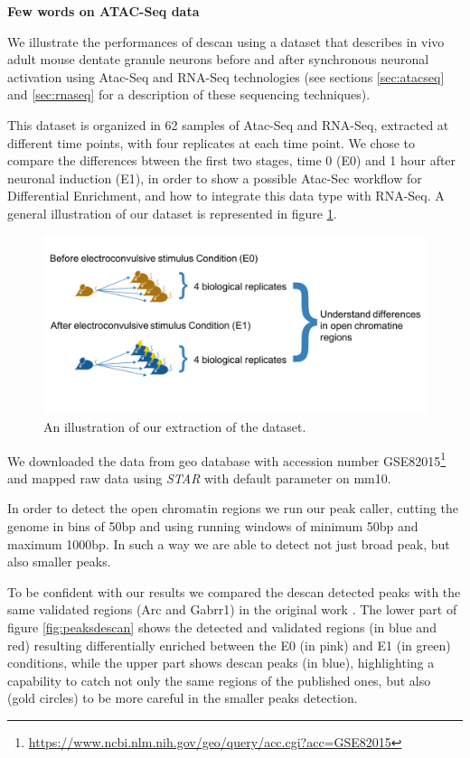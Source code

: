 \textbf{Few words on ATAC-Seq data}

We illustrate the performances of \gls{descan} using a dataset \cite{Su2017} that describes in vivo adult mouse dentate granule neurons before and after synchronous neuronal activation using Atac-Seq and RNA-Seq technologies (see sections \ref{sec:atacseq} and \ref{sec:rnaseq} for a description of these sequencing techniques).

This dataset is organized in 62 samples of Atac-Seq and RNA-Seq, extracted at different time points, with four replicates at each time point.
We chose to compare the differences btween the first two stages, time 0 (E0) and 1 hour after neuronal induction (E1), in order to show a possible Atac-Sec workflow for Differential Enrichment, and how to integrate this data type with RNA-Seq. A general illustration of our dataset is represented in figure \ref{fig:atacdataset}.

\begin{figure}[H]
\includegraphics[width=\textwidth,height=\textheight,keepaspectratio]{img/descan2/dataset.png}
\caption[DEScan2 dataset illustration]{An illustration of our extraction of the \cite{Su2017} dataset.}
\label{fig:atacdataset}
\centering
\end{figure}

We downloaded the data from \gls{geo} database \cite{Edgar2002, Barrett2013} with accession number GSE82015\footnote{\url{https://www.ncbi.nlm.nih.gov/geo/query/acc.cgi?acc=GSE82015}} and mapped raw data using \textit{STAR} \cite{Dobin2013} with default parameter on \gls{mm10}.

In order to detect the open chromatin regions we run our peak caller, cutting the genome in bins of 50bp and using running windows of minimum 50bp and maximum 1000bp. In such a way we are able to detect not just broad peak, but also smaller peaks.

To be confident with our results we compared the \gls{descan} detected peaks with the same validated regions (Arc and Gabrr1) in the original work \cite{Su2017}.
The lower part of figure \ref{fig:peaksdescan} shows the detected and validated regions (in blue and red) resulting differentially enriched between the E0 (in pink) and E1 (in green) conditions, while the upper part shows \gls{descan} peaks (in blue), highlighting a capability to catch not only the same regions of the published ones, but also (gold circles) to be more careful in the smaller peaks detection.

